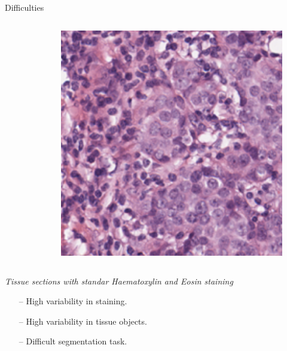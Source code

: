 \documentclass{beamer}
\begin{document}
\begin{frame}{Difficulties}
\begin{columns}[T]
\begin{column}{.3\textwidth}
\begin{figure}[!ht]
\label{}
\end{figure}
\end{column}%
\hfill%
\begin{column}{.3\textwidth}
\begin{figure}[!ht]
\centering
\includegraphics[width=\textwidth]{histo3.png}
\label{}
\end{figure}
\end{column}%
\end{columns}
{\centering \textit{Tissue sections with standar Haematoxylin and Eosin staining}} 
\begin{itemize}
\item [--] High variability in staining.
\item [--] High variability in tissue objects.
\item [--] Difficult segmentation task. 
\end{itemize}


\end{frame}
\end{document}
